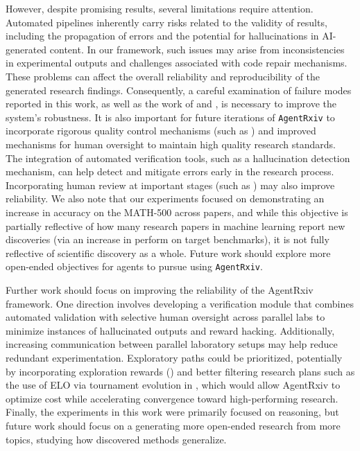 \documentclass[11pt, a4paper]{include/gdm_format}
\begin{document}
However, despite promising results, several limitations require attention. Automated pipelines inherently carry risks related to the validity of results, including the propagation of errors and the potential for hallucinations in AI-generated content. In our framework, such issues may arise from inconsistencies in experimental outputs and challenges associated with code repair mechanisms. These problems can affect the overall reliability and reproducibility of the generated research findings. Consequently, a careful examination of failure modes reported in this work, as well as the work of \cite{lu2024aiscientist} and \cite{schmidgall2025agent}, is necessary to improve the system's robustness. It is also important for future iterations of \texttt{AgentRxiv} to incorporate rigorous quality control mechanisms (such as \cite{kon2025curie}) and improved mechanisms for human oversight to maintain high quality research standards. The integration of automated verification tools, such as a hallucination detection mechanism, can help detect and mitigate errors early in the research process. Incorporating human review at important stages (such as \cite{schmidgall2025agent}) may also improve reliability. We also note that our experiments focused on demonstrating an increase in accuracy on the MATH-500 across papers, and while this objective is partially reflective of how many research papers in machine learning report new discoveries (via an increase in perform on target benchmarks), it is not fully reflective of scientific discovery as a whole. Future work should explore more open-ended objectives for agents to pursue using \texttt{AgentRxiv}.




Further work should focus on improving the reliability of the AgentRxiv framework. One direction involves developing a verification module that combines automated validation with selective human oversight across parallel labs to minimize instances of hallucinated outputs and reward hacking. Additionally, increasing communication between parallel laboratory setups may help reduce redundant experimentation. Exploratory paths could be prioritized, potentially by incorporating exploration rewards (\cite{schmidhuber1991curious, lehman2011novelty}) and better filtering research plans such as the use of ELO via tournament evolution in \cite{gottweis2025aicoscientist}, which would allow AgentRxiv to optimize cost while accelerating convergence toward high-performing research. Finally, the experiments in this work were primarily focused on reasoning, but future work should focus on a generating more open-ended research from more topics, studying how discovered methods generalize. 
\end{document}
